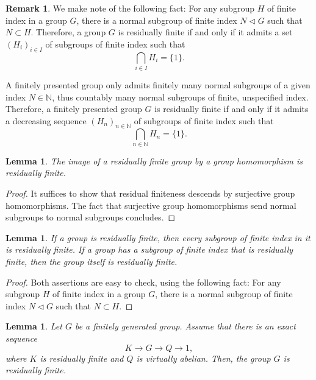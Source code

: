 \documentclass{amsart}
\newcommand{\nn}{\mathbb{N}}
\newtheorem{lemma}[theorem]{Lemma}
\theoremstyle{definition}
\newtheorem{remark}[theorem]{Remark}
\theoremstyle{remark}
\numberwithin{equation}{section}
\begin{document}
\begin{remark}
We make note of the following fact: For any subgroup $H$ of finite index in a group $G$, there is a normal subgroup of finite index $N \triangleleft G$ such that $N\subset H$.
Therefore, a group $G$ is residually finite if and only if it admits a set $(H_i)_{i\in I}$ of subgroups of finite index such that $$\bigcap_{i\in I} H_i=\{1\}.$$

 A finitely presented group only admits finitely many normal subgroups of a given index $N\in\nn$, thus countably many normal subgroups of finite, unspecified index. Therefore, a finitely presented group $G$ is residually finite if and only if it admits a decreasing sequence $(H_n)_{n\in \nn}$ of subgroups of finite index such that
    $$\bigcap_{n\in \nn} H_n=\{1\}.$$
\end{remark}

\begin{lemma}\label{lem:resfinimage}
    The image of a residually finite group by a group homomorphism is residually finite.
\end{lemma}

\begin{proof}
    It suffices to show that residual finiteness descends by surjective group homomorphisms. The fact that surjective group homomorphisms send normal subgroups to normal subgroups concludes.
\end{proof}

\begin{lemma}\label{lem:resfinsubgroup}
    If a group is residually finite, then every subgroup of finite index in it is residually finite. If a group has a subgroup of finite index that is residually finite, then the group itself is residually finite.
\end{lemma}

\begin{proof}
    Both assertions are easy to check, using the following fact: For any subgroup $H$ of finite index in a group $G$, there is a normal subgroup of finite index $N \triangleleft G$ such that $N\subset H$.
\end{proof}


\begin{lemma}\label{lem:res-finite-from-exact}
Let $G$ be a finitely generated group. Assume that there is an exact sequence
$$K\to G\to Q\to 1,$$
where $K$ is residually finite and $Q$ is virtually abelian.
Then, the group $G$ is residually finite.
\end{lemma}
\end{document}
